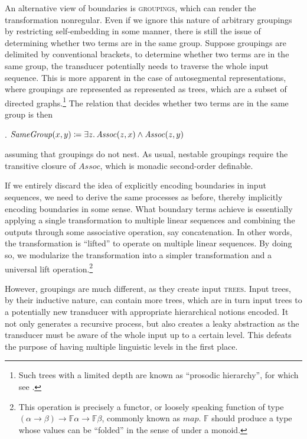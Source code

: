 \documentclass[12pt, a4paper]{report}
\newcommand{\textemph}[1]{\textsc{#1}}
\newcommand{\textterm}[1]{\textsc{#1}\index{#1}}
\begin{document}
An alternative view of boundaries is \textterm{groupings}, which can
render the transformation nonregular.  Even if we ignore this nature
of arbitrary groupings by restricting self-embedding in some manner,
there is still the issue of determining whether two terms are in the
same group.  Suppose groupings are delimited by conventional brackets,
to determine whether two terms are in the same group, the transducer
potentially needs to traverse the whole input sequence.  This is more
apparent in the case of autosegmental representations, where groupings
are represented as represented as trees, which are a subset of
directed graphs.\footnote{Such trees with a limited depth are known as
  \enquote{prosodic hierarchy}, for which see \textcite{nv86pp}.} The
relation that decides whether two terms are in the same group is then

\ex. \(\mathit{SameGroup}(x, y) \coloneq \exists z\ldotp
\mathit{Assoc}(z, x) \land \mathit{Assoc}(z, y)\)

assuming that groupings do not nest.  As usual, nestable groupings
require the transitive closure of \(\mathit{Assoc}\), which is monadic
second-order definable.

If we entirely discard the idea of explicitly encoding boundaries in
input sequences, we need to derive the same processes as before,
thereby implicitly encoding boundaries in some sense.  What boundary
terms achieve is essentially applying a single transformation to
multiple linear sequences and combining the outputs through some
associative operation, say concatenation.  In other words, the
transformation is \enquote{lifted} to operate on multiple linear
sequences.  By doing so, we modularize the transformation into a
simpler transformation and a universal lift operation.\footnote{This
  operation is precisely a functor, or loosely speaking function of
  type
  \((\alpha \to \beta) \to \mathbb{F}\alpha \to \mathbb{F}\beta\),
  commonly known as \(\mathit{map}\).  \(\mathbb{F}\) should produce a
  type whose values can be \enquote{folded} in the sense of
  \textcite{h99tuem} under a monoid.}

However, groupings are much different, as they create input
\textemph{trees}.  Input trees, by their inductive nature, can contain
more trees, which are in turn input trees to a potentially new
transducer with appropriate hierarchical notions encoded.  It not only
generates a recursive process, but also creates a leaky abstraction as
the transducer must be aware of the whole input up to a certain level.
This defeats the purpose of having multiple linguistic levels in the
first place.
\end{document}
